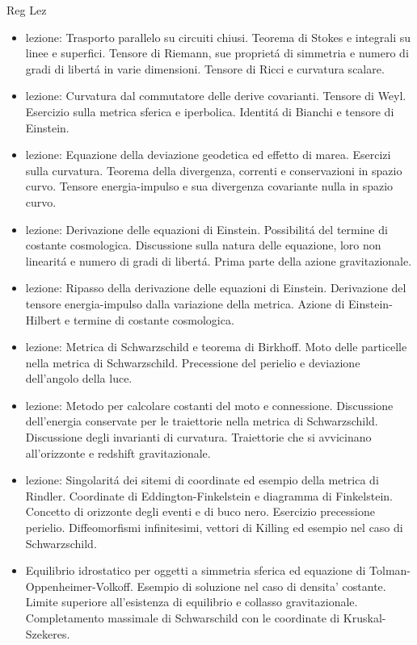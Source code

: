 \begin{frame}[allowframebreaks]{Reg Lez}
\begin{itemize}
\item lezione: Trasporto parallelo su circuiti chiusi. Teorema di Stokes e integrali su linee e superfici. Tensore di Riemann, sue propriet\'a di simmetria e numero di gradi di libert\'a in varie dimensioni. Tensore di Ricci e curvatura scalare.

\item lezione: Curvatura dal commutatore delle derive covarianti. Tensore di Weyl. Esercizio sulla metrica sferica e iperbolica. Identit\'a di Bianchi e tensore di Einstein.

\item  lezione: Equazione della deviazione geodetica ed effetto di marea. Esercizi sulla curvatura. Teorema della divergenza, correnti e conservazioni in spazio curvo. Tensore energia-impulso e sua divergenza covariante nulla in spazio curvo.

\item lezione: Derivazione delle equazioni di Einstein. Possibilit\'a del termine di costante cosmologica. Discussione sulla natura delle equazione, loro non linearit\'a e numero di gradi di libert\'a. Prima parte della azione gravitazionale.
 
 \item lezione: Ripasso della derivazione delle equazioni di Einstein. Derivazione del tensore energia-impulso dalla variazione della metrica. Azione di Einstein-Hilbert e termine di costante cosmologica.
 
\item lezione: Metrica di Schwarzschild e teorema di Birkhoff. Moto delle particelle nella metrica di Schwarzschild. Precessione del perielio e deviazione dell'angolo della luce.

\item lezione: Metodo per calcolare costanti del moto e connessione. Discussione dell'energia conservate per le traiettorie nella metrica di Schwarzschild. Discussione degli invarianti di curvatura. Traiettorie che si avvicinano all'orizzonte e redshift gravitazionale.

\item lezione: Singolarit\'a dei sitemi di coordinate ed esempio della metrica di Rindler. Coordinate di Eddington-Finkelstein e diagramma di Finkelstein. Concetto di orizzonte degli eventi e di buco nero. Esercizio precessione perielio. Diffeomorfismi infinitesimi, vettori di Killing ed esempio nel caso di Schwarzschild.

\item  Equilibrio idrostatico per oggetti a simmetria sferica ed equazione di Tolman-Oppenheimer-Volkoff. Esempio di soluzione nel caso di densita' costante. Limite superiore all'esistenza di equilibrio e collasso gravitazionale. Completamento massimale di Schwarschild con le coordinate di Kruskal-Szekeres.


\end{itemize}
\end{frame}
